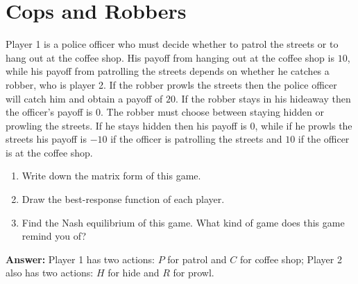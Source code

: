\documentclass[12pt,a4paper]{article}
\begin{document}
\maketitle

\section{Cops and Robbers}
Player 1 is a police officer who must decide whether to patrol the streets or to hang out at the coffee shop. His payoff from hanging out at the coffee shop is \(10\), while his payoff from patrolling the streets depends on whether he catches a robber, who is player 2. If the robber prowls the streets then the police officer will catch him and obtain a payoff of \(20\). If the robber stays in his hideaway then the officer's payoff is \(0\). The robber must choose between staying hidden or prowling the streets. If he stays hidden then his payoff is \(0\), while if he prowls the streets his payoff is \(-10\) if the officer is patrolling the streets and \(10\) if the officer is at the coffee shop.

\begin{enumerate}[label=\alph*.]
  \item Write down the matrix form of this game.
  \item Draw the best-response function of each player.
  \item Find the Nash equilibrium of this game. What kind of game does this game remind you of?
\end{enumerate}

\vspace{0.5cm}

\noindent\textbf{Answer: }Player 1 has two actions: \(P\) for patrol and \(C\) for coffee shop; Player 2 also has two actions: \(H\) for hide and \(R\) for prowl.
\end{document}
